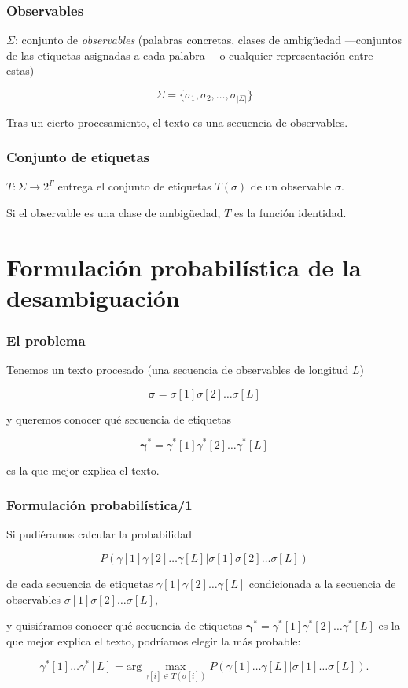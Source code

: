 \documentclass{beamer}
\begin{document}
\begin{frame}
\frametitle{ Observables}

{

{\(\Sigma\): conjunto de \emph{observables} (palabras concretas, clases
  de ambigüedad ---conjuntos de las etiquetas asignadas a cada palabra--- o
  cualquier representación entre estas)} 

{\[\Sigma=\{\sigma_1,\sigma_2,\ldots,\sigma_{|\Sigma|}\}\]}

 {Tras un cierto procesamiento, el texto es una secuencia de observables.}


}
\end{frame}


\begin{frame}
\frametitle{ Conjunto de etiquetas}

{
{\(T:\Sigma\to 2^\Gamma\) entrega el conjunto de etiquetas \(T(\sigma)\) de un
  observable \(\sigma\).}

{Si el observable es una clase de ambigüedad, \(T\) es la función
  identidad.}

}
\end{frame}
\section{Formulación probabilística de la desambiguación}
\begin{frame}
\frametitle{ El problema}

{
{Tenemos un texto procesado (una secuencia de observables de longitud \( L \))

 \[\mathbf{\sigma}=\sigma[1]\sigma[2]\ldots\sigma[L]\]

}

{y queremos conocer qué secuencia de etiquetas

 \[\mathbf{\gamma}^*=\gamma^*[1]\gamma^*[2]\ldots\gamma^*[L]\]

es la que mejor explica el texto.}

}
\end{frame}
\begin{frame}
\frametitle{Formulación probabilística/1}

{
{Si pudiéramos calcular la probabilidad

 \[P(\gamma[1]\gamma[2]\ldots\gamma[L]|\sigma[1]\sigma[2]\ldots\sigma[L])\]
 
 de cada secuencia de etiquetas \(\gamma[1]\gamma[2]\ldots\gamma[L]\)
 condicionada a la secuencia de observables
 \(\sigma[1]\sigma[2]\ldots\sigma[L]\), }

{y quisiéramos conocer qué secuencia de etiquetas
 \(\mathbf{\gamma}^*=\gamma^*[1]\gamma^*[2]\ldots\gamma^*[L]\)
es la que mejor explica el texto, podríamos elegir la más probable:

\[\gamma^*[1]\ldots\gamma^*[L]=\mathrm{arg}
 \max_{\gamma[i]\in T(\sigma[i])} P(\gamma[1]\ldots\gamma[L]|\sigma[1]\ldots\sigma[L]).\]
}

}
\end{frame}
\end{document}
